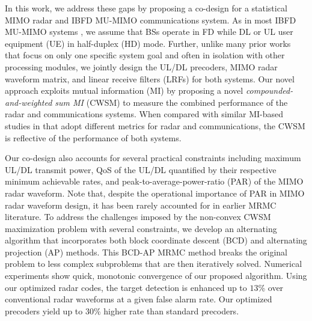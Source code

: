 \documentclass[9pt,journal]{IEEEtran}
\theoremstyle{definition}
\begin{document}
In this work, we address these gaps by proposing a co-design for a statistical MIMO radar and IBFD MU-MIMO communications system. As in most IBFD MU-MIMO systems \cite{biswas2018fdqos,singh2018transceiver,FD_WMMSE}, we assume that BSs operate in FD while DL or UL user equipment (UE) in half-duplex (HD) mode. Further, unlike many prior works that focus on only one specific system goal and often in isolation with other processing modules, we jointly design the UL/DL precoders, MIMO radar waveform matrix, and linear receive filters (LRFs) for both systems. Our novel approach exploits mutual information (MI) by proposing a novel \textit{compounded-and-weighted sum MI} (CWSM) to measure the combined performance of the radar and communications systems. When compared with similar MI-based studies in \cite{biswas2018fdqos,singh2018transceiver,he2019performance} that adopt different metrics for radar and communications, the CWSM is reflective of the performance of both systems. 

Our co-design also accounts for several practical constraints including maximum UL/DL transmit power, QoS of the UL/DL quantified by their respective minimum achievable rates, and peak-to-average-power-ratio (PAR) of the MIMO radar waveform. %
Note that, despite the operational importance of PAR in MIMO radar waveform design, it has been rarely accounted for in earlier MRMC literature. To address the challenges imposed by the non-convex CWSM maximization problem with several constraints, we develop an alternating algorithm that incorporates both block coordinate descent (BCD) and alternating projection (AP) methods. This BCD-AP MRMC method breaks the original problem to less complex subproblems that are then iteratively solved. Numerical experiments show quick, monotonic convergence of our proposed algorithm. Using our optimized radar codes, the target detection is enhanced up to $13$\% over conventional radar waveforms at a given false alarm rate. Our optimized precoders yield up to $30$\% higher rate than standard precoders. %
\end{document}
